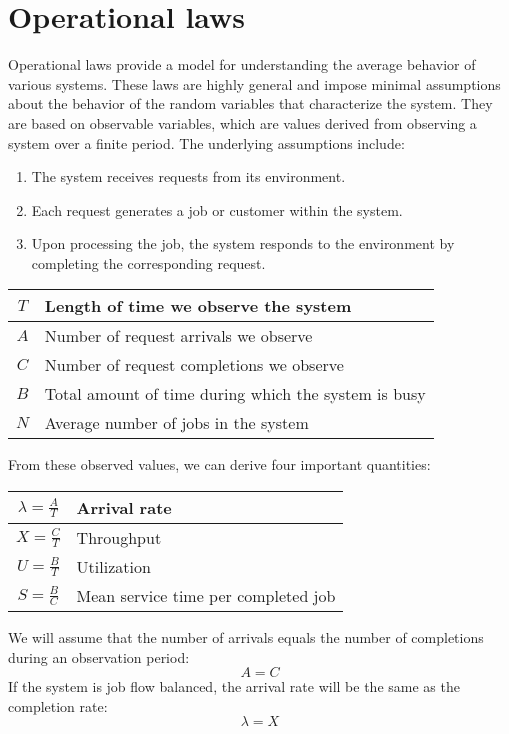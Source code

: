 \section{Operational laws}

Operational laws provide a model for understanding the average behavior of various systems. 
These laws are highly general and impose minimal assumptions about the behavior of the random variables that characterize the system.
They are based on observable variables, which are values derived from observing a system over a finite period.
The underlying assumptions include:
\begin{enumerate}
    \item The system receives requests from its environment.
    \item Each request generates a job or customer within the system.
    \item Upon processing the job, the system responds to the environment by completing the corresponding request.
\end{enumerate}

\renewcommand*{\arraystretch}{2}
\begin{table}[H]
    \centering
    \begin{tabular}{|c|l|}
    \hline
    $T$ & Length of time we observe the system                 \\ \hline
    $A$ & Number of request arrivals we observe                \\ \hline
    $C$ & Number of request completions we observe             \\ \hline
    $B$ & Total amount of time during which the system is busy \\ \hline
    $N$ & Average number of jobs in the system                 \\ \hline
    \end{tabular}
\end{table}
From these observed values, we can derive four important quantities:
\begin{table}[H]
    \centering
    \begin{tabular}{|c|l|}
    \hline
    $\lambda=\frac{A}{T}$ & Arrival rate                        \\ \hline
    $X=\frac{C}{T}$       & Throughput                          \\ \hline
    $U=\frac{B}{T}$       & Utilization                         \\ \hline
    $S=\frac{B}{C}$       & Mean service time per completed job \\ \hline
    \end{tabular}
\end{table}
We will assume that the number of arrivals equals the number of completions during an observation period:
\[A=C\] 
If the system is job flow balanced, the arrival rate will be the same as the completion rate:
\[\lambda=X\]


